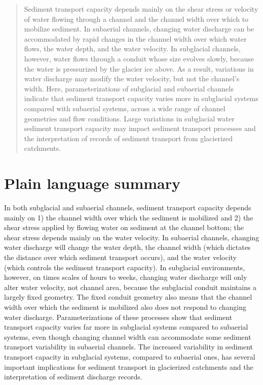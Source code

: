 \documentclass[draft]{agujournal2019}
\begin{document}

\begin{abstract} %
Sediment transport capacity depends mainly on the shear stress or velocity of water flowing through a channel and the channel width over which to mobilize sediment.
In subaerial channels, changing water discharge can be accommodated by rapid changes in the channel width over which water flows, the water depth, and the water velocity.
In subglacial channels, however, water flows through a conduit whose size evolves  slowly, because the water is pressurized by the glacier ice above.
As a result, variations in water discharge may modify the water velocity, but not the channel's width.
Here, parameterizations of subglacial and subaerial channels indicate that sediment transport capacity varies more in subglacial systems compared with subaerial systems, across a wide range of channel geometries and flow conditions.
Large variations in subglacial water sediment transport capacity may impact sediment transport processes and the interpretation of records of sediment transport from glacierized catchments.

  
\end{abstract}

\section*{Plain language summary} %
In both subglacial and subaerial channels, sediment transport capacity depends mainly on 1) the channel width over which the sediment is mobilized  and 2) the shear stress applied by flowing water on sediment at the channel bottom; the shear stress depends mainly on the water velocity.
In subaerial channels, changing water discharge will  change the water depth,  the channel width (which dictates the distance  over which sediment transport  occurs), and the  water velocity (which controls the sediment transport capacity).
 In subglacial environments, however, on times scales of hours to weeks, changing water discharge will only alter  water velocity, not channel area, because the subglacial conduit maintains a largely fixed geometry.
The fixed conduit geometry also means that the channel width over which the sediment is  mobilized also does not respond to changing water discharge.
Parameterizations of these processes show that sediment transport capacity varies far more in subglacial systems compared to subaerial systems, even though changing channel width can accommodate some sediment transport variability in subaerial channels.
The increased variability in sediment transport capacity in subglacial systems, compared to subaerial ones, has several important implications for sediment transport in glacierized catchments and the interpretation of sediment discharge records.
\end{document}
